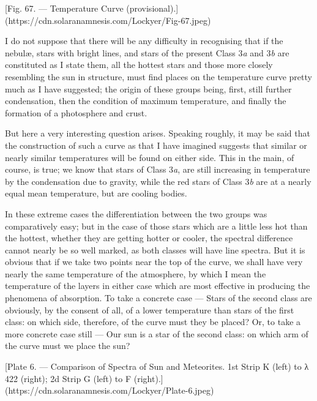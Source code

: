 \documentclass[a4paper, 12pt, oneside, polutonikogreek, english]{article}
\begin{document}
[Fig. 67. --- Temperature Curve (provisional).](https://cdn.solaranamnesis.com/Lockyer/Fig-67.jpeg)

I do not suppose that there will be any difficulty in recognising that if the nebulæ, stars with bright lines, and stars of the present Class 3\emph{a} and 3\emph{b} are constituted as I state them, all the hottest stars and those more closely resembling the sun in structure, must find places on the temperature curve pretty much as I have suggested; the origin of these groups being, first, still further condensation, then the condition of maximum temperature, and finally the formation of a photosphere and crust.

But here a very interesting question arises. Speaking roughly, it may be said that the construction of such a curve as that I have imagined suggests that similar or nearly similar temperatures will be found on either side. This in the main, of course, is true; we know that stars of Class 3\emph{a}, are still increasing in temperature by the condensation due to gravity, while the red stars of Class 3\emph{b} are at a nearly equal mean temperature, but are cooling bodies.

In these extreme cases the differentiation between the two groups was comparatively easy; but in the case of those stars which are a little less hot than the hottest, whether they are getting hotter or cooler, the spectral difference cannot nearly be so well marked, as both classes will have line spectra. But it is obvious that if we take two points near the top of the curve, we shall have very nearly the same temperature of the atmosphere, by which I mean the temperature of the layers in either case which are most effective in producing the phenomena of absorption. To take a concrete case --- Stars of the second class are obviously, by the consent of all, of a lower temperature than stars of the first class: on which side, therefore, of the curve must they be placed? Or, to take a more concrete case still --- Our sun is a star of the second class: on which arm of the curve must we place the sun?

[Plate 6. --- Comparison of Spectra of Sun and Meteorites. 1st Strip K (left) to λ 422 (right); 2d Strip G (left) to F (right).](https://cdn.solaranamnesis.com/Lockyer/Plate-6.jpeg)
\end{document}

